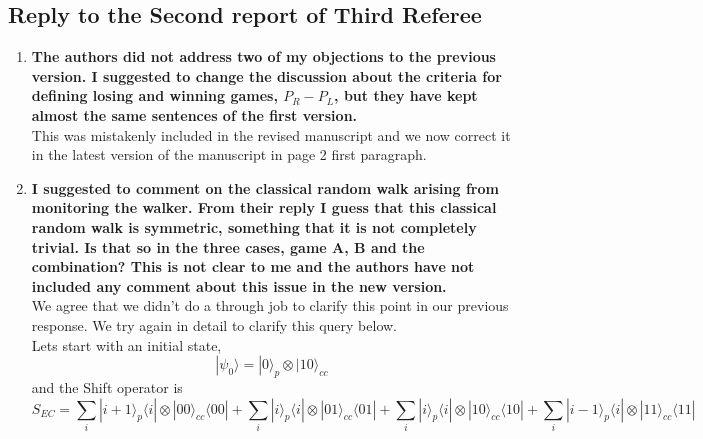 \documentclass[12pt]{article}
\begin{document}
\subsection*{Reply to the Second report of Third Referee}
\begin{enumerate}
\item \textbf{The authors did not address two of my objections to the previous
version. I suggested to change the discussion about the criteria for
defining losing and winning games, $P_R-P_L$, but they have kept almost
the same sentences of the first version.}\\
This was mistakenly included in the revised manuscript and we now correct it in the latest version of the manuscript in page 2 first paragraph.

\item \textbf{I suggested to comment on the classical random walk arising from
monitoring the walker. From their reply I guess that this classical
random walk is symmetric, something that it is not completely trivial.
Is that so in the three cases, game A, B and the combination? This is
not clear to me and the authors have not included any comment about
this issue in the new version.}\\
We agree that we didn't do a through job to clarify this point in our previous  response. We try again in detail to clarify this query below.\\
Lets start with an initial state, $$| \psi_0 \rangle= |0\rangle_p \otimes |10\rangle_{cc}$$
and the Shift operator is 
\begin{equation*}\label{shift_operator_two_spins_1}
S_{EC} =  \sum_i |i+1 \rangle_{p} \langle i| \otimes |00\rangle_{cc} \langle 00|  
+ \sum_i |i\rangle_{p} \langle i| \otimes |01\rangle_{cc} \langle 01| 
+ \sum_i |i\rangle_{p} \langle i| \otimes |10\rangle_{cc} \langle 10|
+ \sum_i |i-1 \rangle_{p} \langle i| \otimes |11\rangle_{cc} \langle 11|
\end{equation*}


\end{enumerate}
\end{document}
